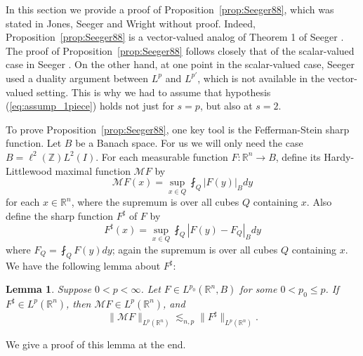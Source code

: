\documentclass[12pt,leqno]{amsart}
\def\R{\mathbb{R}}
\def\Z{\mathbb{Z}}
\theoremstyle{plain}
\newtheorem{lem}[thm]{Lemma}
\numberwithin{equation}{section}
\begin{document}
In this section we provide a proof of Proposition~\ref{prop:Seeger88}, which was stated in Jones, Seeger and Wright \cite{MR2434308} without proof. Indeed, Proposition~\ref{prop:Seeger88} is a vector-valued analog of Theorem 1 of Seeger \cite{MR955772}. The proof of Proposition~\ref{prop:Seeger88} follows closely that of the scalar-valued case in Seeger \cite{MR955772}. On the other hand, at one point in the scalar-valued case, Seeger used a duality argument between $L^p$ and $L^{p'}$, which is not available in the vector-valued setting. This is why we had to assume that hypothesis (\ref{eq:assump_1piece}) holds not just for $s = p$, but also at $s = 2$.

To prove Proposition~\ref{prop:Seeger88}, one key tool is the Fefferman-Stein sharp function. Let $B$ be a Banach space. For us we will only need the case $B = \ell^2(\Z) L^2(I) $. For each measurable function $F \colon \R^n \to B$, define its Hardy-Littlewood maximal function $\mathcal{M} F$ by
\[
\mathcal{M} F(x) = \sup_{x \in Q} \fint_Q |F(y)|_B dy
\]
for each $x \in \R^n$, where the supremum is over all cubes $Q$ containing $x$. Also define the sharp function $F^{\sharp}$ of $F$ by
\[
F^{\sharp}(x) = \sup_{x \in Q} \fint_{Q} |F(y) - F_Q|_B dy
\]
where $F_Q = \fint_Q F(y) dy$; again the supremum is over all cubes $Q$ containing $x$. We have the following lemma about $F^{\sharp}$:

\begin{lem} \label{lem:FSsharp}
Suppose $0 < p < \infty$. Let $F \in L^{p_0}(\R^n,B)$ for some $0 < p_0 \leq p$. If $F^{\sharp} \in L^p(\R^n)$, then $\mathcal{M} F \in L^p(\R^n)$, and 
\[
\|\mathcal{M} F \|_{L^p(\R^n)} \lesssim_{n,p} \|F^{\sharp}\|_{L^p(\R^n)}.
\]
\end{lem}

We give a proof of this lemma at the end.
\end{document}

